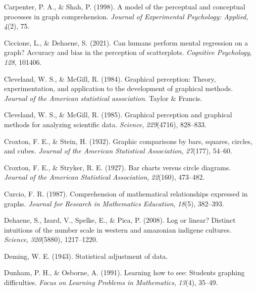\documentclass[print]{nuthesis}
\newlength{\cslhangindent}
\newenvironment{CSLReferences}[2]%
{\setlength{\parindent}{0pt}%
\everypar{\setlength{\hangindent}{\cslhangindent}}\ignorespaces}%
{\par}
\begin{document}
\begin{CSLReferences}{1}{0}
\leavevmode{}%
Carpenter, P. A., \& Shah, P. (1998). A model of the perceptual and conceptual processes in graph comprehension. \emph{Journal of Experimental Psychology: Applied}, \emph{4}(2), 75.

\leavevmode{}%
Ciccione, L., \& Dehaene, S. (2021). Can humans perform mental regression on a graph? Accuracy and bias in the perception of scatterplots. \emph{Cognitive Psychology}, \emph{128}, 101406.

\leavevmode{}%
Cleveland, W. S., \& McGill, R. (1984). Graphical perception: Theory, experimentation, and application to the development of graphical methods. \emph{Journal of the American statistical association}. Taylor \& Francis.

\leavevmode{}%
Cleveland, W. S., \& McGill, R. (1985). Graphical perception and graphical methods for analyzing scientific data. \emph{Science}, \emph{229}(4716), 828--833.

\leavevmode{}%
Croxton, F. E., \& Stein, H. (1932). Graphic comparisons by bars, squares, circles, and cubes. \emph{Journal of the American Statistical Association}, \emph{27}(177), 54--60.

\leavevmode{}%
Croxton, F. E., \& Stryker, R. E. (1927). Bar charts versus circle diagrams. \emph{Journal of the American Statistical Association}, \emph{22}(160), 473--482.

\leavevmode{}%
Curcio, F. R. (1987). Comprehension of mathematical relationships expressed in graphs. \emph{Journal for Research in Mathematics Education}, \emph{18}(5), 382--393.

\leavevmode{}%
Dehaene, S., Izard, V., Spelke, E., \& Pica, P. (2008). Log or linear? Distinct intuitions of the number scale in western and amazonian indigene cultures. \emph{Science}, \emph{320}(5880), 1217--1220.

\leavevmode{}%
Deming, W. E. (1943). Statistical adjustment of data.

\leavevmode{}%
Dunham, P. H., \& Osborne, A. (1991). Learning how to see: Students graphing difficulties. \emph{Focus on Learning Problems in Mathematics}, \emph{13}(4), 35--49.


\end{CSLReferences}
\end{document}

